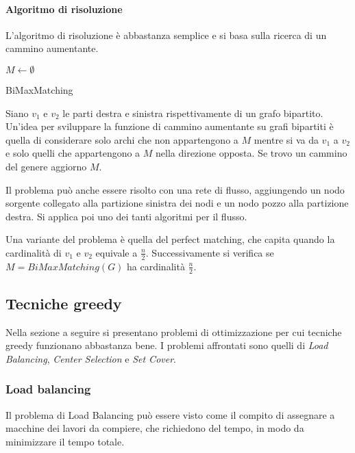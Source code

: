 \paragraph{Algoritmo di risoluzione}
L'algoritmo di risoluzione è abbastanza semplice e si basa sulla 
ricerca di un cammino aumentante.

\begin{algorithm}[H]
    \SetAlgoLined
     $M \gets \emptyset$\\
     \caption{BiMaxMatching}
\end{algorithm}
Siano $v_1$ e $v_2$ le parti destra e sinistra rispettivamente di un grafo bipartito.\\
Un'idea per sviluppare la funzione di cammino aumentante su grafi bipartiti è quella
di considerare solo archi che non appartengono a $M$ mentre si va da $v_1$ a $v_2$ e 
solo quelli che appartengono a $M$ nella direzione opposta.
Se trovo un cammino del genere aggiorno $M$.
\begin{remark}
    Il problema può anche essere risolto con una rete di flusso, aggiungendo un nodo
    sorgente collegato alla partizione sinistra dei nodi e un nodo pozzo alla partizione
    destra. Si applica poi uno dei tanti algoritmi per il flusso.
\end{remark}
\begin{remark}
    Una variante del problema è quella del perfect matching, che capita quando 
    la cardinalità di $v_1$ e $v_2$ equivale a $\frac{n}{2}$. Successivamente si 
    verifica se $M = \mathit{BiMaxMatching}(G)$ ha cardinalità $\frac{n}{2}$.
\end{remark}

\subsection{Tecniche greedy}
Nella sezione a seguire si presentano problemi di ottimizzazione per cui 
tecniche greedy funzionano abbastanza bene. 
I problemi affrontati sono quelli di \emph{Load Balancing}, \emph{Center Selection} e \emph{Set Cover}.

\subsubsection{Load balancing}
\label{lb}
Il problema di Load Balancing può essere visto come il compito
di assegnare a macchine dei lavori da compiere, che richiedono del tempo, 
in modo da minimizzare il tempo totale.

